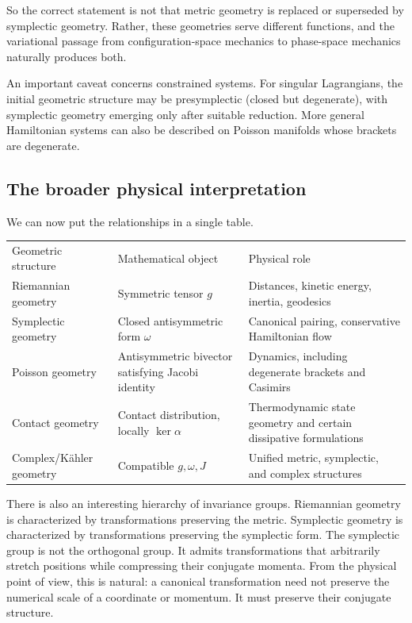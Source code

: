 So the correct statement is not that metric geometry is replaced or superseded
by symplectic geometry. Rather, these geometries serve different functions, and
the variational passage from configuration-space mechanics to phase-space
mechanics naturally produces both.

An important caveat concerns constrained systems. For singular Lagrangians, the
initial geometric structure may be presymplectic (closed but degenerate), with
symplectic geometry emerging only after suitable reduction. More general
Hamiltonian systems can also be described on Poisson manifolds whose brackets
are degenerate.

\subsection{ The broader physical interpretation}
We can now put the relationships in a single table.

\noindent
\begin{tabular}{p{}p{}p{}}
    Geometric structure&	Mathematical object&	Physical role\\
    Riemannian geometry&	Symmetric tensor \(g\)&	Distances, kinetic energy, inertia, geodesics\\
    Symplectic geometry&	Closed antisymmetric form \(\omega\)&	Canonical pairing, conservative Hamiltonian flow\\
    Poisson geometry&	Antisymmetric bivector satisfying Jacobi identity&	Dynamics, including degenerate brackets and Casimirs\\
    Contact geometry&	Contact distribution, locally \(\ker\alpha\)&	Thermodynamic state geometry and certain dissipative formulations\\
    Complex/Kähler geometry&	Compatible \(g,\omega,J\)&	Unified metric, symplectic, and complex structures\\
\end{tabular}

There is also an interesting hierarchy of invariance groups.
Riemannian geometry is characterized by transformations preserving the metric.
Symplectic geometry is characterized by transformations preserving the
symplectic form.
The symplectic group is not the orthogonal group. It admits transformations
that arbitrarily stretch positions while compressing their conjugate momenta.
From the physical point of view, this is natural: a canonical transformation
need not preserve the numerical scale of a coordinate or momentum. It must
preserve their conjugate structure.

